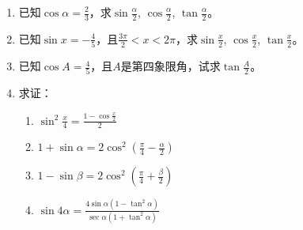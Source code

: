 \begin{ex}
\begin{enumerate}
    \item 已知$\cos\alpha=\frac{2}{3}$，求$\sin\frac{\alpha}{2}$, $\cos \frac{\alpha}{2}$, $\tan \frac{\alpha}{2}$。
    \item 已知$\sin x=-\frac{4}{5}$，且$\frac{3\pi}{2}<x<2\pi$，求$\sin\frac{x}{2}$, $\cos \frac{x}{2}$, $\tan \frac{x}{2}$。
    \item 已知$\cos A=\frac{4}{5}$，且$A$是第四象限角，试求$\tan\frac{A}{2}$。
    \item 求证：
    \begin{multicols}{2}
\begin{enumerate}
    \item $\sin^2\frac{x}{4}=\frac{1-\cos\frac{x}{2}}{2}$
    \item $1+\sin\alpha=2\cos^2\left(\frac{\pi}{4}-\frac{\alpha}{2}\right)$
    \item $1-\sin\beta=2\cos^2\left(\frac{\pi}{4}+\frac{\beta}{2}\right)$
\item $\sin 4\alpha=\frac{4\sin\alpha(1-\tan^2\alpha)}{\sec\alpha(1+\tan^2\alpha)}$
\end{enumerate}        
    \end{multicols}
\end{enumerate}    
\end{ex}

